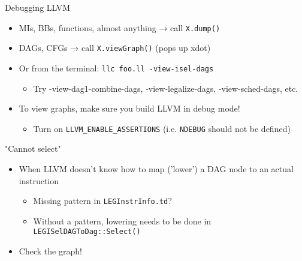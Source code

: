 \begin{frame}{Debugging LLVM}

\begin{itemize}
    \item MIs, BBs, functions, almost anything → call \texttt{X.dump()}
    \item DAGs, CFGs → call \texttt{X.viewGraph()} (pops up xdot)
    \item Or from the terminal: \texttt{llc foo.ll -view-isel-dags}
    \begin{itemize}
        \item Try -view-dag1-combine-dags, -view-legalize-dags, -view-sched-dags, etc.
    \end{itemize}
    \item To view graphs, make sure you build LLVM in debug mode!
    \begin{itemize}
        \item Turn on \texttt{LLVM\_ENABLE\_ASSERTIONS} (i.e. \texttt{NDEBUG} should not be defined)
    \end{itemize}
\end{itemize}

\end{frame}


\begin{frame}{"Cannot select"}

\begin{itemize}
    \item When LLVM doesn't know how to map ('lower') a DAG node to an actual instruction
    \begin{itemize}
        \item Missing pattern in \texttt{LEGInstrInfo.td}?
        \item Without a pattern, lowering needs to be done in \texttt{LEGISelDAGToDag::Select()}
    \end{itemize}
    \item Check the graph!
\end{itemize}

\end{frame}


